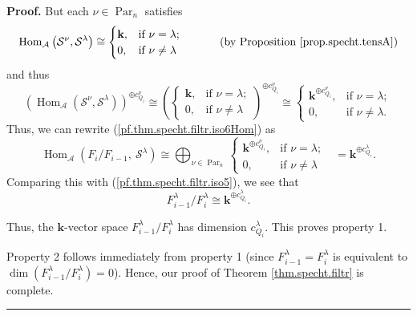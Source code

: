 \documentclass[numbers=enddot,12pt,final,onecolumn,notitlepage]{scrartcl}%
\theoremstyle{definition}
\newenvironment{proof}[1][Proof]{\noindent\textbf{#1.} }{\ \rule{0.5em}{0.5em}}
\begin{document}
\begin{proof}
But each $\nu\in\operatorname*{Par}\nolimits_{n}$ satisfies%
\[
\operatorname*{Hom}\nolimits_{\mathcal{A}}\left(  \mathcal{S}^{\nu
},\mathcal{S}^{\lambda}\right)  \cong%
\begin{cases}
\mathbf{k}, & \text{if }\nu=\lambda;\\
0, & \text{if }\nu\neq\lambda
\end{cases}
\ \ \ \ \ \ \ \ \ \ \left(  \text{by Proposition \ref{prop.specht.tensA}%
}\right)
\]
and thus
\begin{equation}
\left(  \operatorname*{Hom}\nolimits_{\mathcal{A}}\left(  \mathcal{S}^{\nu
},\mathcal{S}^{\lambda}\right)  \right)  ^{\oplus c_{Q_{i}}^{\nu}}\cong\left(
%
\begin{cases}
\mathbf{k}, & \text{if }\nu=\lambda;\\
0, & \text{if }\nu\neq\lambda
\end{cases}
\right)  ^{\oplus c_{Q_{i}}^{\nu}}\cong%
\begin{cases}
\mathbf{k}^{\oplus c_{Q_{i}}^{\nu}}, & \text{if }\nu=\lambda;\\
0, & \text{if }\nu\neq\lambda.
\end{cases}
\nonumber
\end{equation}
Thus, we can rewrite (\ref{pf.thm.specht.filtr.iso6Hom}) as%
\[
\operatorname*{Hom}\nolimits_{\mathcal{A}}\left(  F_{i}/F_{i-1},\ \mathcal{S}%
^{\lambda}\right)  \cong\bigoplus_{\nu\in\operatorname*{Par}\nolimits_{n}}%
\begin{cases}
\mathbf{k}^{\oplus c_{Q_{i}}^{\nu}}, & \text{if }\nu=\lambda;\\
0, & \text{if }\nu\neq\lambda
\end{cases}
\ \ \ =\mathbf{k}^{\oplus c_{Q_{i}}^{\lambda}}.
\]
Comparing this with (\ref{pf.thm.specht.filtr.iso5}), we see that%
\[
F_{i-1}^{\lambda}/F_{i}^{\lambda}\cong\mathbf{k}^{\oplus c_{Q_{i}}^{\lambda}%
}.
\]


Thus, the $\mathbf{k}$-vector space $F_{i-1}^{\lambda}/F_{i}^{\lambda}$ has
dimension $c_{Q_{i}}^{\lambda}$. This proves property 1.

Property 2 follows immediately from property 1 (since $F_{i-1}^{\lambda}%
=F_{i}^{\lambda}$ is equivalent to $\dim\left(  F_{i-1}^{\lambda}%
/F_{i}^{\lambda}\right)  =0$). Hence, our proof of Theorem
\ref{thm.specht.filtr} is complete.
\end{proof}
\end{document}
